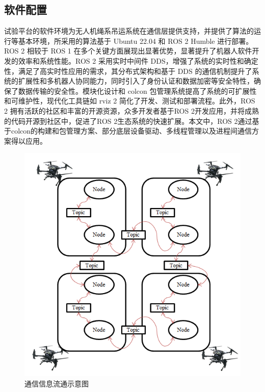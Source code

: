 \documentclass[lang=chs, degree=master, blindreview=true, winfonts=true]{yanputhesis}
\begin{document}
\subsection{软件配置}
试验平台的软件环境为无人机绳系吊运系统在通信层提供支持，并提供了算法的运行等基本环境，所采用的算法基于 Ubuntu 22.04 和 ROS 2 Humble 进行部署。ROS 2 相较于 ROS 1 在多个关键方面展现出显著优势，显著提升了机器人软件开发的效率和系统性能。ROS 2 采用实时中间件 DDS，增强了系统的实时性和确定性，满足了高实时性应用的需求，其分布式架构和基于 DDS 的通信机制提升了系统的扩展性和多机器人协同能力，同时引入了身份认证和数据加密等安全特性，确保了数据传输的安全性。模块化设计和 colcon 包管理系统提高了系统的可扩展性和可维护性，现代化工具链如 rviz 2 简化了开发、测试和部署流程。此外，ROS 2 拥有活跃的社区和丰富的开源资源，众多开发者基于ROS 2开发应用，并将成熟的代码开源到社区中，促进了ROS 2生态系统的快速扩展。本文中，ROS 2通过基于colcon的构建和包管理方案、部分底层设备驱动、多线程管理以及进程间通信方案得以应用。

\begin{figure}[hbt!]
	\centering
	\includegraphics[width=27pc]{picture/ros.png} 
	\caption{通信信息流通示意图} 
	\label{ros}
\end{figure}
\end{document}
